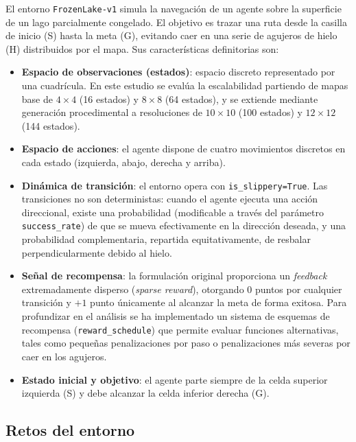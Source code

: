 \documentclass[11pt,a4paper]{article}
\begin{document}
El entorno \texttt{FrozenLake-v1} simula la navegación de un agente sobre la superficie de un lago parcialmente congelado. El objetivo es trazar una ruta desde la casilla de inicio (S) hasta la meta (G), evitando caer en una serie de agujeros de hielo (H) distribuidos por el mapa. Sus características definitorias son:
\begin{itemize}
  \item \textbf{Espacio de observaciones (estados)}: espacio discreto representado por una cuadrícula. En este estudio se evalúa la escalabilidad partiendo de mapas base de $4\times 4$ (16 estados) y $8\times 8$ (64 estados), y se extiende mediante generación procedimental a resoluciones de $10\times 10$ (100 estados) y $12\times 12$ (144 estados).
  \item \textbf{Espacio de acciones}: el agente dispone de cuatro movimientos discretos en cada estado (izquierda, abajo, derecha y arriba).
  \item \textbf{Dinámica de transición}: el entorno opera con \texttt{is\_slippery=True}. Las transiciones no son deterministas: cuando el agente ejecuta una acción direccional, existe una probabilidad (modificable a través del parámetro \texttt{success\_rate}) de que se mueva efectivamente en la dirección deseada, y una probabilidad complementaria, repartida equitativamente, de resbalar perpendicularmente debido al hielo.
  \item \textbf{Señal de recompensa}: la formulación original proporciona un \emph{feedback} extremadamente disperso (\emph{sparse reward}), otorgando 0 puntos por cualquier transición y $+1$ punto únicamente al alcanzar la meta de forma exitosa. Para profundizar en el análisis se ha implementado un sistema de esquemas de recompensa (\texttt{reward\_schedule}) que permite evaluar funciones alternativas, tales como pequeñas penalizaciones por paso o penalizaciones más severas por caer en los agujeros.
  \item \textbf{Estado inicial y objetivo}: el agente parte siempre de la celda superior izquierda (S) y debe alcanzar la celda inferior derecha (G).
\end{itemize}

\subsection{Retos del entorno}
\end{document}
